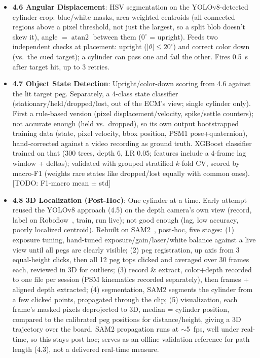 \documentclass[11pt]{article}
\begin{document}
\begin{itemize}
  auto-labeled frames from an earlier checkpoint; 70/20/10
  train/val/test split. Fine-tuned from COCO, 100 epochs,
  640$\times$640, augmentation: HSV jitter, 50\% horizontal flip,
  $\pm$0.3 scale, $\pm$0.1 translation, 50\% mosaic, $\pm$5$^\circ$
  rotation. Runs at 320$\times$320 on the left camera at inference;
  backbone for 4.6--4.7. [TODO: accuracy (mAP)]
  \item \textbf{4.6 Angular Displacement}: HSV segmentation on the
  YOLOv8-detected cylinder crop: blue/white masks, area-weighted
  centroids (all connected regions above a pixel threshold, not just
  the largest, so a split blob doesn't skew it), angle $=
  \operatorname{atan2}$ between them ($0^\circ$ = upright). Feeds two
  independent checks at placement: upright ($|\theta| \le 20^\circ$)
  and correct color down (vs.\ the cued target); a cylinder can pass
  one and fail the other. Fires 0.5~s after target hit, up to 3
  retries.
  \item \textbf{4.7 Object State Detection}: Upright/color-down
  scoring from 4.6 against the lit target peg. Separately, a 4-class
  state classifier (stationary/held/dropped/lost, out of the ECM's
  view; single cylinder only). First a rule-based version
  (pixel displacement/velocity, spike/settle counters); not accurate
  enough (held vs.\ dropped), so its own output bootstrapped training
  data (state, pixel velocity, bbox position, PSM1 pose+quaternion),
  hand-corrected against a video recording as ground truth. XGBoost
  classifier~\cite{xgboost} trained on that (300 trees, depth 6, LR
  0.05; features include a 4-frame lag window + deltas); validated
  with grouped stratified $k$-fold CV, scored by macro-F1 (weights
  rare states like dropped/lost equally with common ones). [TODO:
  F1-macro mean $\pm$ std]
  \item \textbf{4.8 3D Localization (Post-Hoc)}: One cylinder at a
  time. Early attempt reused the YOLOv8 approach (4.5) on the depth
  camera's own view (record, label on Roboflow~\cite{roboflow}, train,
  run live); not good enough (lag, low accuracy, poorly localized
  centroid). Rebuilt on SAM2~\cite{sam2}, post-hoc, five stages: (1)
  exposure tuning, hand-tuned exposure/gain/laser/white balance
  against a live view until all pegs are clearly visible; (2) peg
  registration, up axis from 3 equal-height clicks, then all 12 peg
  tops clicked and averaged over 30 frames each, reviewed in 3D for
  outliers; (3) record \& extract, color+depth recorded to one file
  per session (PSM kinematics recorded separately), then frames +
  aligned depth extracted; (4) segmentation, SAM2 segments the
  cylinder from a few clicked points, propagated through the clip;
  (5) visualization, each frame's masked pixels deprojected to 3D,
  median = cylinder position, compared to the calibrated peg
  positions for distance/height, giving a 3D trajectory over the
  board. SAM2 propagation runs at $\sim$5~fps, well under real-time,
  so this stays post-hoc; serves as an offline validation reference
  for path length (4.3),
  not a delivered real-time measure.
\end{itemize}
\end{document}
